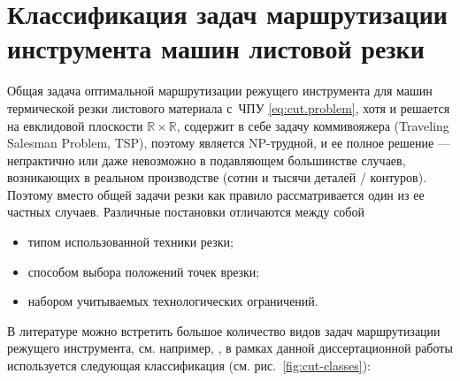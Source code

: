 
\section{Классификация задач
маршрутизации инструмента
машин листовой резки}
\label{sec:cut.class}

Общая задача оптимальной маршрутизации режущего
инструмента для машин термической резки листового материала с~ЧПУ
\eqref{eq:cut.problem},
хотя и решается на евклидовой плоскости
$\mathbb R \times \mathbb R$,
содержит в себе задачу коммивояжера
(Traveling Salesman Problem, TSP),
поэтому является NP-трудной,
и ее полное решение --- непрактично
или даже невозможно в подавляющем большинстве случаев,
возникающих в реальном производстве
(сотни и тысячи деталей / контуров).
Поэтому вместо общей задачи резки
как правило рассматривается один из ее частных случаев.
Различные постановки отличаются между собой
\begin{itemize}
  \item типом использованной техники резки;
  \item способом выбора положений точек врезки;
  \item набором учитываемых технологических ограничений.
\end{itemize}

В литературе можно встретить большое количество
видов задач маршрутизации режущего инструмента,
см. например,
\cite{bi:Hoeft1997,bi:dewil-review,bi:Stylios},
в рамках данной диссертационной работы
используется следующая классификация
(см. рис.~\ref{fig:cut-classes}):

